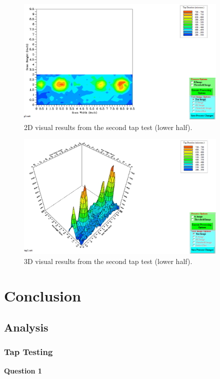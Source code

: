 \documentclass[12 pt]{report}
\begin{document}
\begin{figure}[htbp]
	\centering
	\includegraphics[width=4in]{images/graphs/tap testing/S4G2tap2-2D}
	\caption{2D visual results from the second tap test (lower half).}
	\label{fig:tt2_2d}
\end{figure}

\begin{figure}[htbp]
	\centering
	\includegraphics[width=4in]{images/graphs/tap testing/S4G2tap2-3D}
	\caption{3D visual results from the second tap test (lower half).}
	\label{fig:tt2_3d}
\end{figure}

\chapter{Conclusion} \label{conclusion-chapter}
\section{Analysis} \label{analysis}
\subsection{Tap Testing} \label{tap_testing}
\textbf{Question 1}
\end{document}
